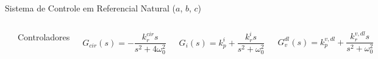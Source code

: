 









\begin{frame}{Sistema de Controle em Referencial Natural ($a$, $b$, $c$)}

\begin{columns}
\centering

\includegraphics[width=0.9\linewidth]{./figuras/figuras_nrf/controle_VI_NRF2}

\centering

Controladores

\begin{equation*}
G_{cir}(s) = - \frac{k_r^{cir} s}{s^2 + 4\omega_0^2}
\end{equation*}

\begin{equation*}
G_i(s) = k_p^{i} + \frac{k_r^{i} s}{s^2 + \omega_0^2}
\end{equation*} 


\begin{equation*}
G_v^{dl}(s) = k_p^{v,dl} + \frac{k_r^{v,dl} s}{s^2 + \omega_0^2}
\end{equation*} 
\vfill

\end{columns}


\end{frame}
